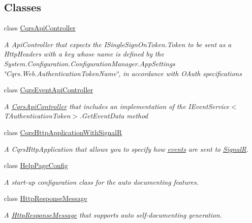 \subsection*{Classes}
\begin{DoxyCompactItemize}
\item 
class \hyperlink{classCqrs_1_1WebApi_1_1CqrsApiController}{Cqrs\+Api\+Controller}
\begin{DoxyCompactList}\small\item\em A Api\+Controller that expects the I\+Single\+Sign\+On\+Token.\+Token to be sent as a Http\+Headers with a key whose name is defined by the System.\+Configuration.\+Configuration\+Manager.\+App\+Settings \char`\"{}\+Cqrs.\+Web.\+Authentication\+Token\+Name\char`\"{}, in accordance with O\+Auth specifications \end{DoxyCompactList}\item 
class \hyperlink{classCqrs_1_1WebApi_1_1CqrsEventApiController}{Cqrs\+Event\+Api\+Controller}
\begin{DoxyCompactList}\small\item\em A \hyperlink{classCqrs_1_1WebApi_1_1CqrsApiController}{Cqrs\+Api\+Controller} that includes an implementation of the I\+Event\+Service$<$\+T\+Authentication\+Token$>$.\+Get\+Event\+Data method \end{DoxyCompactList}\item 
class \hyperlink{classCqrs_1_1WebApi_1_1CqrsHttpApplicationWithSignalR}{Cqrs\+Http\+Application\+With\+SignalR}
\begin{DoxyCompactList}\small\item\em A Cqrs\+Http\+Application that allows you to specify how \hyperlink{}{events} are sent to \hyperlink{namespaceCqrs_1_1WebApi_1_1SignalR}{SignalR}. \end{DoxyCompactList}\item 
class \hyperlink{classCqrs_1_1WebApi_1_1HelpPageConfig}{Help\+Page\+Config}
\begin{DoxyCompactList}\small\item\em A start-\/up configuration class for the auto documenting features. \end{DoxyCompactList}\item 
class \hyperlink{classCqrs_1_1WebApi_1_1HttpResponseMessage}{Http\+Response\+Message}
\begin{DoxyCompactList}\small\item\em A \hyperlink{classCqrs_1_1WebApi_1_1HttpResponseMessage}{Http\+Response\+Message} that supports auto self-\/documenting generation. \end{DoxyCompactList}\end{DoxyCompactItemize}
